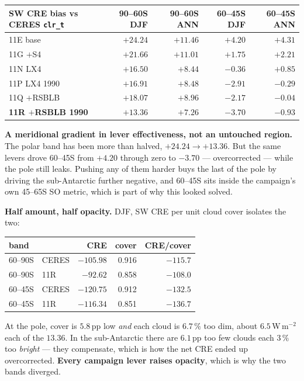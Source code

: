 \documentclass[10pt]{article}
\begin{document}
\begin{center}\small
\begin{tabular}{lrrrr}
\toprule
SW CRE bias vs CERES \texttt{clr\_t} & 90--60S DJF & 90--60S ANN & 60--45S DJF & 60--45S ANN \\
\midrule
11E base & $+24.24$ & $+11.46$ & $+4.20$ & $+4.31$ \\
11G $+$S4 & $+21.66$ & $+11.01$ & $+1.75$ & $+2.21$ \\
11N LX4 & $+16.50$ & $+8.44$ & $-0.36$ & $+0.85$ \\
11P LX4 1990 & $+16.91$ & $+8.48$ & $-2.91$ & $-0.29$ \\
11Q $+$RSBLB & $+18.07$ & $+8.96$ & $-2.17$ & $-0.04$ \\
\textbf{11R $+$RSBLB 1990} & $\mathbf{+13.36}$ & $\mathbf{+7.26}$ & $\mathbf{-3.70}$ & $\mathbf{-0.93}$ \\
\bottomrule
\end{tabular}
\end{center}

\textbf{A meridional gradient in lever effectiveness, not an untouched region.} The polar
band has been more than halved, $+24.24\to+13.36$. But the same levers drove 60--45S from
$+4.20$ through zero to $-3.70$ --- overcorrected --- while the pole still leaks. Pushing
any of them harder buys the last of the pole by driving the sub-Antarctic further
negative, and 60--45S sits inside the campaign's own 45--65S SO metric, which is part of
why this looked solved.

\textbf{Half amount, half opacity.} DJF, SW CRE per unit cloud cover isolates the two:

\begin{center}\small
\begin{tabular}{llrrr}
\toprule
band & & CRE & cover & CRE/cover \\
\midrule
60--90S & CERES & $-105.98$ & 0.916 & $-115.7$ \\
60--90S & 11R & $-92.62$ & 0.858 & $\mathbf{-108.0}$ \\
60--45S & CERES & $-120.75$ & 0.912 & $-132.5$ \\
60--45S & 11R & $-116.34$ & 0.851 & $\mathbf{-136.7}$ \\
\bottomrule
\end{tabular}
\end{center}

At the pole, cover is $5.8$\,pp low \emph{and} each cloud is $6.7\,\%$ too dim, about
$6.5$\,W\,m$^{-2}$ each of the $13.36$. In the sub-Antarctic there are $6.1$\,pp too few
clouds each $3\,\%$ too \emph{bright} --- they compensate, which is how the net CRE ended
up overcorrected. \textbf{Every campaign lever raises opacity}, which is why the two bands
diverged.
\end{document}
